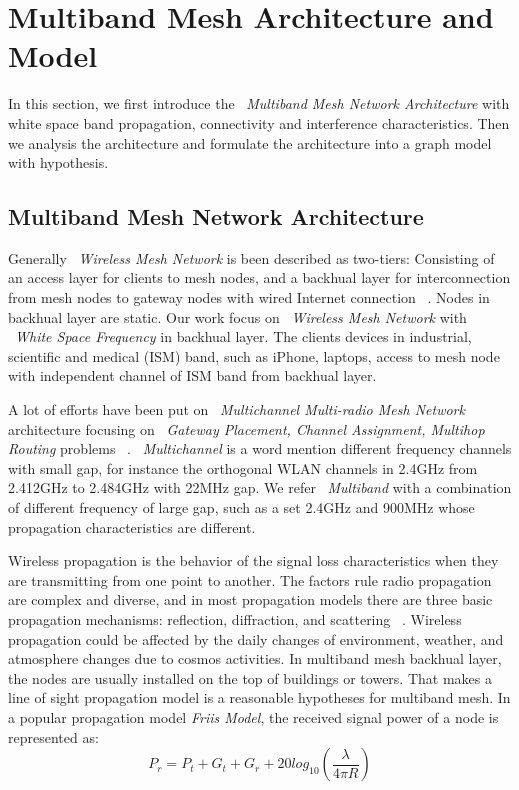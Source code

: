\section{Multiband Mesh Architecture and Model}
\label{sec:architecture}

In this section, we first introduce the 
~\emph{Multiband Mesh Network Architecture}
with white space band propagation, connectivity and interference characteristics.
Then we analysis the architecture and formulate the architecture into a graph model with hypothesis.

\subsection{Multiband Mesh Network Architecture}
\label{subsec:architecture}
Generally ~\emph{Wireless Mesh Network} is been described as two-tiers:
Consisting of an access layer for clients to mesh nodes, and a backhual layer for interconnection from mesh nodes to gateway nodes with wired Internet connection ~\cite{akyildiz2005wireless}. 
Nodes in backhual layer are static.
Our work focus on ~\emph{Wireless Mesh Network} with ~\emph{White Space Frequency} in backhual layer. 
The clients devices in industrial, scientific and medical (ISM) band, such as iPhone, laptops, access to mesh node with independent channel of ISM band from backhual layer. 

A lot of efforts have been put on ~\emph{Multichannel Multi-radio Mesh Network} architecture focusing on ~\emph{Gateway Placement, Channel Assignment, Multihop Routing} problems ~\cite{si2010overview}.
~\emph{Multichannel} is a word mention different frequency channels with small gap, for instance the orthogonal WLAN channels in 2.4GHz from 2.412GHz to 2.484GHz with 22MHz gap.
We refer ~\emph{Multiband} with a combination of different frequency of large gap, such as a set 2.4GHz and 900MHz whose propagation characteristics are different.

Wireless propagation is the behavior of the signal loss characteristics when they are transmitting from one point to another.
The factors rule radio propagation are complex and diverse, and in most propagation models there are three basic propagation mechanisms: reflection, diffraction, and scattering ~\cite{andersen1995propagation}.
Wireless propagation could be affected by the daily changes of environment, weather, and atmosphere changes due to cosmos activities. 
In multiband mesh backhual layer, the nodes are usually installed on the top of buildings or towers. That makes a line of sight propagation model is a reasonable hypotheses for multiband mesh.
In a popular propagation model \emph{Friis Model}, the received signal power of a node is represented as: 
\begin{equation}
\label{eq:friis}
P_r=P_t+G_t+G_r+20log_{10}(\frac{\lambda}{4\pi R})
\end{equation}

